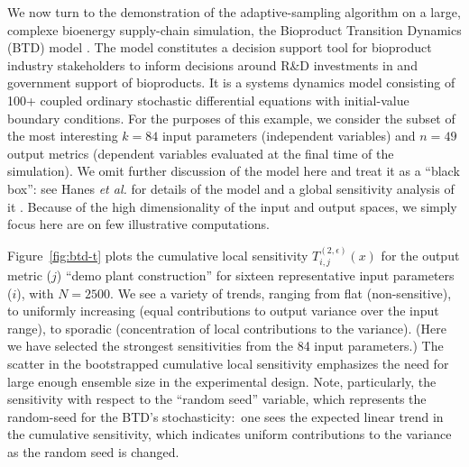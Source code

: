 \documentclass[12pt]{article}
\begin{document}
We now turn to the demonstration of the adaptive-sampling algorithm on a large, complexe bioenergy supply-chain simulation, the Bioproduct Transition Dynamics (BTD) model \cite{hanes_supporting_2020} \cite{hanes_transition_2019} \cite{hanes_introduction_2018} \cite{hanes_system_2018}. The model constitutes a decision support tool for bioproduct industry stakeholders to inform decisions around R\&D investments in and government support of bioproducts. It is a systems dynamics model consisting of 100+ coupled ordinary stochastic differential equations with initial-value boundary conditions. For the purposes of this example, we consider the subset of the most interesting $k = 84$ input parameters (independent variables) and $n = 49$ output metrics (dependent variables evaluated at the final time of the simulation). We omit further discussion of the model here and treat it as a ``black box'': see Hanes \textit{et al.} for details of the model \cite{btd_tech_report} and a global sensitivity analysis of it \cite{btd_analysis_paper}. Because of the high dimensionality of the input and output spaces, we simply focus here are on few illustrative computations.

Figure~\ref{fig:btd-t} plots the cumulative local sensitivity $T_{i,j}^{(2,\epsilon)}(x)$ for the output metric ($j$) ``demo plant construction'' for sixteen representative input parameters ($i$), with $N = 2500$. We see a variety of trends, ranging from flat (non-sensitive), to uniformly increasing (equal contributions to output variance over the input range), to sporadic (concentration of local contributions to the variance). (Here we have selected the strongest sensitivities from the 84 input parameters.) The scatter in the bootstrapped cumulative local sensitivity emphasizes the need for large enough ensemble size in the experimental design. Note, particularly, the sensitivity with respect to the ``random seed'' variable, which represents the random-seed for the BTD's stochasticity:\ one sees the expected linear trend in the cumulative sensitivity, which indicates uniform contributions to the variance as the random seed is changed.
\end{document}
